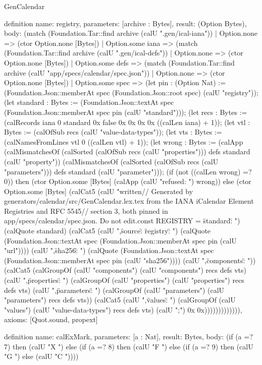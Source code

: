 \begin{lexlean}{GenCalendar}
\begin{semanticmodule}
definition{
  name: registry,
  parameters: [archive : Bytes],
  result: (Option Bytes),
  body: (match (Foundation.Tar::find archive (calU ".gen/ical-iana"))
    | Option.none => (ctor Option.none [Bytes])
    | Option.some iana => (match (Foundation.Tar::find archive (calU ".gen/ical-defs"))
      | Option.none => (ctor Option.none [Bytes])
      | Option.some defs => (match (Foundation.Tar::find archive (calU "app/specs/calendar/spec.json"))
        | Option.none => (ctor Option.none [Bytes])
        | Option.some spec => (let pin : (Option Nat) := (Foundation.Json::memberAt spec (Foundation.Json::root spec) (calU "registry")); (let standard : Bytes := (Foundation.Json::textAt spec (Foundation.Json::memberAt spec pin (calU "standard"))); (let recs : Bytes := (calRecords iana 0 standard 0x false 0x 0x 0x 0x ((calLen iana) + 1)); (let vtl : Bytes := (calOfSub recs (calU "value-data-types")); (let vts : Bytes := (calNamesFromLines vtl 0 ((calLen vtl) + 1)); (let wrong : Bytes := (calApp (calMismatchesOf (calSorted (calOfSub recs (calU "properties"))) defs standard (calU "property")) (calMismatchesOf (calSorted (calOfSub recs (calU "parameters"))) defs standard (calU "parameter"))); (if (not ((calLen wrong) =? 0)) then (ctor Option.some [Bytes] (calApp (calU "refused: ") wrong)) else (ctor Option.some [Bytes] (calCat5 (calU "written\n// Generated by generators/calendar/src/GenCalendar.lex.tex from the IANA iCalendar Element Registries and RFC 5545\n// section 3, both pinned in app/specs/calendar/spec.json. Do not edit.\nexport const REGISTRY = {\n \"standard\": ") (calQuote standard) (calCat5 (calU ",\n \"source\": {\n  \"registry\": ") (calQuote (Foundation.Json::textAt spec (Foundation.Json::memberAt spec pin (calU "url")))) (calU ",\n  \"sha256\": ") (calQuote (Foundation.Json::textAt spec (Foundation.Json::memberAt spec pin (calU "sha256")))) (calU "\n },\n \"components\": ")) (calCat5 (calGroupOf (calU "components") (calU "components") recs defs vts) (calU ",\n \"properties\": ") (calGroupOf (calU "properties") (calU "properties") recs defs vts) (calU ",\n \"parameters\": ") (calGroupOf (calU "parameters") (calU "parameters") recs defs vts)) (calCat5 (calU ",\n \"values\": ") (calGroupOf (calU "values") (calU "value-data-types") recs defs vts) (calU "\n};\n") 0x 0x))))))))))))),
  axioms: [Quot.sound, propext]
}

definition{
  name: calExMark,
  parameters: [a : Nat],
  result: Bytes,
  body: (if (a =? 7) then (calU "X ") else (if (a =? 8) then (calU "F ") else (if (a =? 9) then (calU "G ") else (calU "C "))))
}


\end{semanticmodule}
\end{lexlean}
